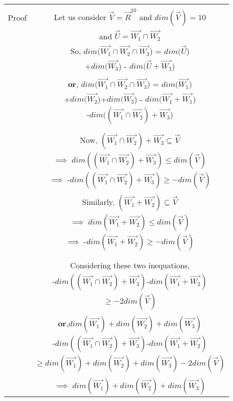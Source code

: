 \documentclass[journal,12pt,twocolumn]{IEEEtran}
\begin{document}
\newpage
\begin{table}[h!]
\begin{center}
\begin{tabular}{|c|c|}
\hline
& \\
Proof & Let us consider $\vec{V}=\vec{R}^{10}$ and $dim(\vec{V})=10$\\
& and $\vec{U} = \vec{W_1} \cap \vec{W_2}$\\
& So, $dim(\vec{W_1} \cap \vec{W_2} \cap \vec{W_3}$) = $dim(\vec{U}$)\\
& +$dim(\vec{W_3}$) - $dim(\vec{U}+\vec{W_3}$)\\
& \\
& $\textbf{or,}$ $dim(\vec{W_1} \cap \vec{W_2} \cap \vec{W_3}$) = $dim(\vec{W_1}$)\\
& +$dim(\vec{W_2}$)+$dim(\vec{W_3}$) - $dim(\vec{W_1}+\vec{W_1}$)\\
& -$dim((\vec{W_1} \cap \vec{W_2})+\vec{W_3}$)\\
& \\
\hline
& \\
& Now, $(\vec{W_1} \cap \vec{W_2})+\vec{W_3} \subseteq \vec{V}$\\
& $\implies$ $dim((\vec{W_1} \cap \vec{W_2})+\vec{W_3})\leq dim(\vec{V})$\\
& $\implies$ -$dim((\vec{W_1} \cap \vec{W_2})+\vec{W_3})\geq -dim(\vec{V})$\\
& \\
& Similarly, $(\vec{W_1}+\vec{W_2})\subseteq \vec{V}$\\
& $\implies$ $dim(\vec{W_1}+\vec{W_2})\leq dim(\vec{V})$\\
& $\implies$ -$dim(\vec{W_1}+\vec{W_2})\geq -dim(\vec{V})$\\
& \\
\hline
& \\
& Considering these two inequations,\\
& -$dim((\vec{W_1} \cap \vec{W_2})+\vec{W_3})$-$dim(\vec{W_1}+\vec{W_2})$\\
& $\geq -2dim(\vec{V})$\\
& \\
& $\textbf{or,} dim(\vec{W_1})+dim(\vec{W_2})+dim(\vec{W_3})$\\
& -$dim((\vec{W_1} \cap \vec{W_2})+\vec{W_3})$-$dim(\vec{W_1}+\vec{W_2})$\\
& $\geq dim(\vec{W_1})+dim(\vec{W_2})+dim(\vec{W_3})-2dim(\vec{V})$\\
& \\
& $\implies$ $dim(\vec{W_1})+dim(\vec{W_2})+dim(\vec{W_3})$\\

\end{tabular}
\end{center}
\end{table}
\end{document}
